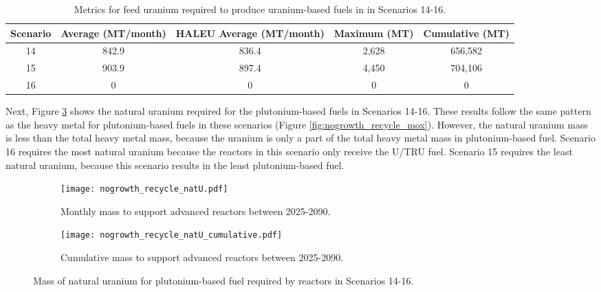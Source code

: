\begin{table}[h!]
    \centering 
    \caption{Metrics for feed uranium required to produce 
    uranium-based fuels in in Scenarios 14-16.}
    \label{tab:s14-16_feed}
    \begin{tabular}{c c c c c}
        \hline 
        Scenario & Average (MT/month) & HALEU Average (MT/month) &
        Maximum (MT) & Cumulative (MT) \\
        \hline 
        14 & 842.9 & 836.4 & 2,628 & 656,582 \\
        15 & 903.9 & 897.4 & 4,450 & 704,106\\
        16 & 0 & 0 & 0 & 0\\
        \hline
        
    \end{tabular}
\end{table}

Next, Figure \ref{fig:nogrowth_recycle_natu} shows the natural 
uranium required for the plutonium-based fuels in Scenarios 14-16. 
These results follow the same pattern as the heavy metal for 
plutonium-based fuels in these scenarios (Figure 
\ref{fig:nogrowth_recycle_mox}). However, the natural 
uranium mass is less than the total heavy metal mass, because the 
uranium is only a part of the total heavy metal mass in plutonium-based 
fuel. Scenario 16 requires 
the most natural uranium because the reactors in this scenario 
only receive the U/TRU fuel. Scenario 15 requires the least 
natural uranium, because this scenario results in the least 
plutonium-based fuel.

\begin{figure}[h!]
    \centering
    \begin{subfigure}[b]{0.45\textwidth}
        \centering
        \texttt{[image: nogrowth\_recycle\_natU.pdf]}
        \caption{Monthly mass to support
        advanced reactors between 2025-2090.}
        \label{fig:nogrowth_recycle_AR_natu}
    \end{subfigure}
    \hfill
    \begin{subfigure}[b]{0.45\textwidth}
        \centering
        \texttt{[image: nogrowth\_recycle\_natU\_cumulative.pdf]}
        \caption{Cumulative mass to support advanced reactors between 2025-2090.}
        \label{fig:nogrowth_recycle_natu_cumulative}
    \end{subfigure}
       \caption{Mass of natural uranium for plutonium-based fuel required 
       by reactors
        in Scenarios 14-16.}
       \label{fig:nogrowth_recycle_natu}
\end{figure}

